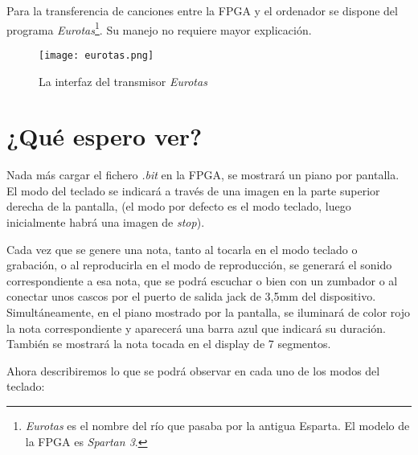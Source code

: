 \documentclass{article}
\begin{document}
\begin{enumerate}
		Para la transferencia de canciones entre la FPGA y el ordenador se dispone del programa {\itshape Eurotas}\footnote{{\itshape Eurotas} es el nombre del río que pasaba por la antigua Esparta. El modelo de la FPGA es {\itshape Spartan 3}.}. Su manejo no requiere mayor explicación.

\begin{figure}[ht] \centering
	\texttt{[image: eurotas.png]}

	\caption{La interfaz del transmisor {\itshape Eurotas}}
	\label{fig:eurotas}
\end{figure}
	\end{enumerate}
\section{¿Qué espero ver?}

	Nada más cargar el fichero {\itshape .bit} en la FPGA, se mostrará un piano por pantalla. El modo del teclado se indicará a través de una imagen en la parte superior derecha de la pantalla, (el modo por defecto es el modo teclado, luego inicialmente habrá una imagen de {\itshape stop}).

	\medskip Cada vez que se genere una nota, tanto al tocarla en el modo teclado o grabación, o al reproducirla en el modo de reproducción, se generará el sonido correspondiente a esa nota, que se podrá escuchar o bien con un zumbador o al conectar unos cascos por el puerto de salida jack de 3,5mm del dispositivo. Simultáneamente, en el piano mostrado por la pantalla, se iluminará de color rojo la nota correspondiente y aparecerá una barra azul que indicará su duración. También se mostrará la nota tocada en el display de 7 segmentos.

	\medskip Ahora describiremos lo que se podrá observar en cada uno de los modos del teclado:
\end{document}
